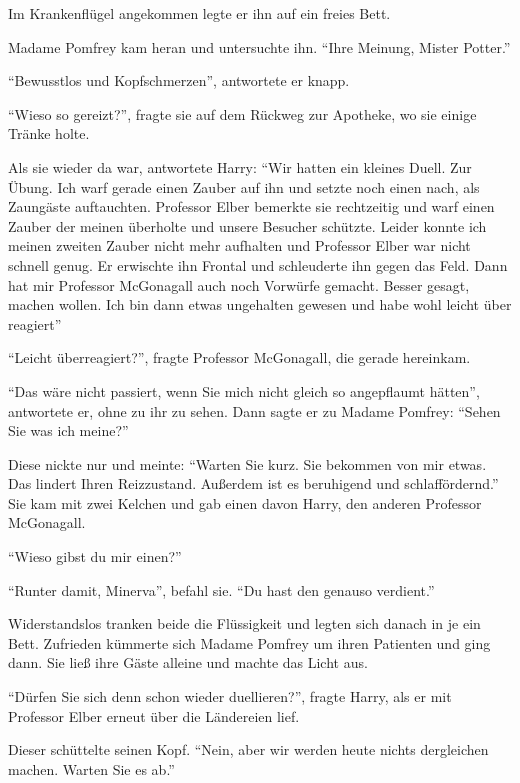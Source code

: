 Im Krankenflügel angekommen legte er ihn auf ein freies Bett.

Madame Pomfrey kam heran und untersuchte ihn. \enquote{Ihre Meinung, Mister Potter.}

\enquote{Bewusstlos und Kopfschmerzen}, antwortete er knapp.

\enquote{Wieso so gereizt?}, fragte sie auf dem Rückweg zur Apotheke, wo sie einige Tränke holte.

Als sie wieder da war, antwortete Harry: \enquote{Wir hatten ein kleines Duell. Zur Übung. Ich warf gerade einen Zauber auf ihn und setzte noch einen nach, als Zaungäste auftauchten. Professor Elber bemerkte sie rechtzeitig und warf einen Zauber der meinen überholte und unsere Besucher schützte. Leider konnte ich meinen zweiten Zauber nicht mehr aufhalten und Professor Elber war nicht schnell genug. Er erwischte ihn Frontal und schleuderte ihn gegen das Feld. Dann hat mir Professor McGonagall auch noch Vorwürfe gemacht. Besser gesagt, machen wollen. Ich bin dann etwas ungehalten gewesen und habe wohl leicht über reagiert}

\enquote{Leicht überreagiert?}, fragte Professor McGonagall, die gerade hereinkam.

\enquote{Das wäre nicht passiert, wenn Sie mich nicht gleich so angepflaumt hätten}, antwortete er, ohne zu ihr zu sehen. Dann sagte er zu Madame Pomfrey: \enquote{Sehen Sie was ich meine?}

Diese nickte nur und meinte: \enquote{Warten Sie kurz. Sie bekommen von mir etwas. Das lindert Ihren Reizzustand. Außerdem ist es beruhigend und schlaffördernd.} Sie kam mit zwei Kelchen und gab einen davon Harry, den anderen Professor McGonagall.

\enquote{Wieso gibst du mir einen?}

\enquote{Runter damit, Minerva}, befahl sie. \enquote{Du hast den genauso verdient.}

Widerstandslos tranken beide die Flüssigkeit und legten sich danach in je ein Bett. Zufrieden kümmerte sich Madame Pomfrey um ihren Patienten und ging dann. Sie ließ ihre Gäste alleine und machte das Licht aus.

\trenn

\enquote{Dürfen Sie sich denn schon wieder duellieren?}, fragte Harry, als er mit Professor Elber erneut über die Ländereien lief.

Dieser schüttelte seinen Kopf. \enquote{Nein, aber wir werden heute nichts dergleichen machen. Warten Sie es ab.}

